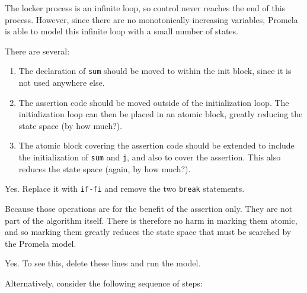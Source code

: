 The locker process is an infinite loop, so control
never reaches the end of this process.
However, since there are no monotonically increasing variables,
Promela is able to model this infinite loop with a small
number of states.


There are several:
\begin{enumerate}
\item	The declaration of {\tt sum} should be moved to within
	the init block, since it is not used anywhere else.
\item	The assertion code should be moved outside of the
	initialization loop.  The initialization loop can
	then be placed in an atomic block, greatly reducing
	the state space (by how much?).
\item	The atomic block covering the assertion code should
	be extended to include the initialization of {\tt sum}
	and {\tt j}, and also to cover the assertion.
	This also reduces the state space (again, by how
	much?).
\end{enumerate}


Yes.  Replace it with {\tt if-fi} and remove the two {\tt break} statements.


Because those operations are for the benefit of the
assertion only.  They are not part of the algorithm itself.
There is therefore no harm in marking them atomic, and
so marking them greatly reduces the state space that must
be searched by the Promela model.


Yes.  To see this, delete these lines and run the model.

Alternatively, consider the following sequence of steps:

